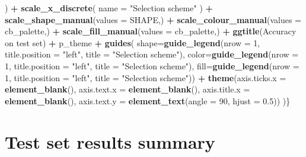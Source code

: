 \documentclass[
]{book}
\newenvironment{Shaded}{\begin{snugshade}}{\end{snugshade}}
\newcommand{\AttributeTok}[1]{\textcolor[rgb]{0.13,0.29,0.53}{#1}}
\newcommand{\DecValTok}[1]{\textcolor[rgb]{0.00,0.00,0.81}{#1}}
\newcommand{\FloatTok}[1]{\textcolor[rgb]{0.00,0.00,0.81}{#1}}
\newcommand{\FunctionTok}[1]{\textcolor[rgb]{0.13,0.29,0.53}{\textbf{#1}}}
\newcommand{\NormalTok}[1]{#1}
\newcommand{\SpecialCharTok}[1]{\textcolor[rgb]{0.81,0.36,0.00}{\textbf{#1}}}
\newcommand{\StringTok}[1]{\textcolor[rgb]{0.31,0.60,0.02}{#1}}
\begin{document}
\begin{Shaded}
\begin{Highlighting}[]
\NormalTok{    ) }\SpecialCharTok{+}
    \FunctionTok{scale\_x\_discrete}\NormalTok{(}
    \AttributeTok{name =} \StringTok{"Selection scheme"}
\NormalTok{    ) }\SpecialCharTok{+}
    \FunctionTok{scale\_shape\_manual}\NormalTok{(}\AttributeTok{values =}\NormalTok{ SHAPE,) }\SpecialCharTok{+}
    \FunctionTok{scale\_colour\_manual}\NormalTok{(}\AttributeTok{values =}\NormalTok{ cb\_palette,) }\SpecialCharTok{+}
    \FunctionTok{scale\_fill\_manual}\NormalTok{(}\AttributeTok{values =}\NormalTok{ cb\_palette,) }\SpecialCharTok{+}
    \FunctionTok{ggtitle}\NormalTok{(}\StringTok{\textquotesingle{}Accuracy on test set\textquotesingle{}}\NormalTok{) }\SpecialCharTok{+}
\NormalTok{    p\_theme }\SpecialCharTok{+}
    \FunctionTok{guides}\NormalTok{(}
    \AttributeTok{shape=}\FunctionTok{guide\_legend}\NormalTok{(}\AttributeTok{nrow =} \DecValTok{1}\NormalTok{, }\AttributeTok{title.position =} \StringTok{"left"}\NormalTok{,}
                        \AttributeTok{title =} \StringTok{"Selection scheme"}\NormalTok{),}
    \AttributeTok{color=}\FunctionTok{guide\_legend}\NormalTok{(}\AttributeTok{nrow =} \DecValTok{1}\NormalTok{, }\AttributeTok{title.position =} \StringTok{"left"}\NormalTok{,}
                        \AttributeTok{title =} \StringTok{"Selection scheme"}\NormalTok{),}
    \AttributeTok{fill=}\FunctionTok{guide\_legend}\NormalTok{(}\AttributeTok{nrow =} \DecValTok{1}\NormalTok{, }\AttributeTok{title.position =} \StringTok{"left"}\NormalTok{,}
                        \AttributeTok{title =} \StringTok{"Selection scheme"}\NormalTok{)) }\SpecialCharTok{+}
    \FunctionTok{theme}\NormalTok{(}\AttributeTok{axis.ticks.x =} \FunctionTok{element\_blank}\NormalTok{(),}
            \AttributeTok{axis.text.x =} \FunctionTok{element\_blank}\NormalTok{(),}
            \AttributeTok{axis.title.x =} \FunctionTok{element\_blank}\NormalTok{(),}
            \AttributeTok{axis.text.y =} \FunctionTok{element\_text}\NormalTok{(}\AttributeTok{angle =} \DecValTok{90}\NormalTok{, }\AttributeTok{hjust =} \FloatTok{0.5}\NormalTok{))}
\NormalTok{)\}}
\end{Highlighting}
\end{Shaded}

\hypertarget{test-set-results-summary}{%
\section{Test set results summary}\label{test-set-results-summary}}
\end{document}
